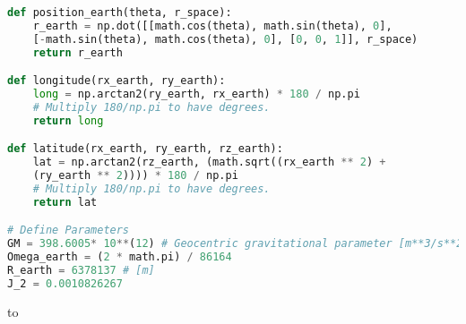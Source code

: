 \documentclass[12pt,a4paper,notitlepage,oneside,openright]{report}
\begin{document}
\begin{center}
\begin{lstlisting}[language=Python, formfeed=\newpage, extendedchars=true]
def position_earth(theta, r_space):
    r_earth = np.dot([[math.cos(theta), math.sin(theta), 0],
    [-math.sin(theta), math.cos(theta), 0], [0, 0, 1]], r_space)
    return r_earth

def longitude(rx_earth, ry_earth):
    long = np.arctan2(ry_earth, rx_earth) * 180 / np.pi
    # Multiply 180/np.pi to have degrees.
    return long

def latitude(rx_earth, ry_earth, rz_earth):
    lat = np.arctan2(rz_earth, (math.sqrt((rx_earth ** 2) +
    (ry_earth ** 2)))) * 180 / np.pi
    # Multiply 180/np.pi to have degrees.
    return lat

# Define Parameters
GM = 398.6005* 10**(12) # Geocentric gravitational parameter [m**3/s**2]
Omega_earth = (2 * math.pi) / 86164
R_earth = 6378137 # [m]
J_2 = 0.0010826267
\end{lstlisting}
\end{center}

\def\dashfill{\cleaders\hbox{-}\hfill}
\hbox to \hsize{\dashfill\hfil}
\end{document}
